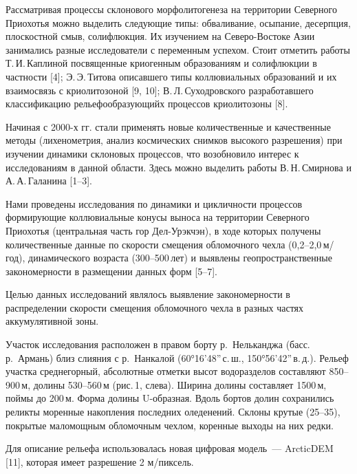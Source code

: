  

\makeProcTitle
{}

Рассматривая процессы склонового морфолитогенеза на территории Северного Приохотья
можно выделить следующие типы: обваливание, осыпание, десерпция, плоскостной смыв, солифлюкция.
Их изучением на Северо-Востоке Азии занимались разные исследователи с переменным успехом.
Стоит отметить работы Т.\,И.\,Каплиной посвященные криогенным образованиям
и солифлюкции в частности [4]; Э.\,Э.\,Титова описавшего типы коллювиальных образований
и их взаимосвязь с криолитозоной [9, 10]; В.\,Л.\,Суходровского разработавшего классификацию рельефообразующийх процессов криолитозоны [8].

Начиная с 2000-х гг. стали применять новые количественные и качественные методы (лихенометрия, анализ космических снимков высокого разрешения) при изучении динамики склоновых процессов,
что возобновило интерес к исследованиям в данной области. Здесь можно выделить работы В.\,Н.\,Смирнова и А.\,А.\,Галанина [1--3].

Нами проведены исследования по динамики и цикличности процессов формирующие коллювиальные конусы выноса на территории Северного Приохотья (центральная часть гор Дел-Урэкчэн), в ходе которых получены количественные данные по скорости смещения обломочного чехла (0,2--2,0\,м/год), динамического возраста (300--500\,лет) и выявлены геопространственные закономерности в размещении данных форм [5--7].

Целью данных исследований являлось выявление закономерности в распределении скорости смещения обломочного чехла в разных частях аккумулятивной зоны.

Участок исследования расположен в правом борту р.~Нельканджа (басс. р.~Армань) близ слияния с р.~Нанкалой (60°16’48”\,с.\,ш., 150°56’42”\,в.\,д.). Рельеф участка среднегорный, абсолютные отметки высот водоразделов составляют 850--900\,м, долины 530--560\,м (рис.\,1, слева). Ширина долины составляет 1500\,м, поймы до 200\,м. Форма долины U-образная. Вдоль бортов долин сохранились реликты моренные накопления последних оледенений. Склоны крутые (25--35\dg), покрытые маломощным обломочным чехлом, коренные выходы на них редки.

Для описание рельефа использовалась новая цифровая модель~--- ArcticDEM [11], которая имеет разрешение 2 м/пиксель.

